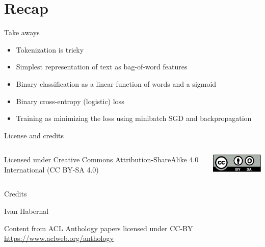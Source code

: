 \documentclass[12pt,aspectratio=169,handout]{beamer}
\begin{document}
\section*{Recap}

\begin{frame}{Take aways}
	
\begin{itemize}
	\item Tokenization is tricky	
	\item Simplest representation of text as bag-of-word features
	\item Binary classification as a linear function of words and a sigmoid
	\item Binary cross-entropy (logistic) loss
	\item Training as minimizing the loss using minibatch SGD and backpropagation
\end{itemize}
	
\end{frame}









\begin{frame}{License and credits}
	
	\begin{columns}
		\begin{column}{0.7\textwidth}
			Licensed under Creative Commons Attribution-ShareAlike 4.0 International (CC BY-SA 4.0)
		\end{column}
		\begin{column}{0.2\textwidth}
			\includegraphics[width=0.9\linewidth]{img/cc-by-sa-icon.pdf}
		\end{column}
	\end{columns}
	
	\bigskip
	
	Credits
	
	\begin{scriptsize}
		
		Ivan Habernal
		
		Content from ACL Anthology papers licensed under CC-BY \url{https://www.aclweb.org/anthology}
		
	\end{scriptsize}
	
\end{frame}
\end{document}
